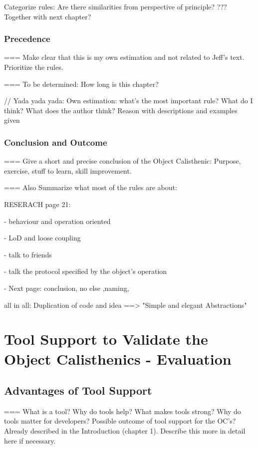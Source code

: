 Categorize rules: Are there similarities from perspective of principle? ??? Together with next chapter?

\subsection{Precedence}
=== Make clear that this is my own estimation and not related to Jeff's text. Prioritize the rules. 

=== To be determined: How long is this chapter?

\begin{itshape}
// Yada yada yada: 
Own estimation: what's the most important rule? 
What do I think?
What does the author think? 
Reason with descriptions and examples given
\end{itshape}

\subsection{Conclusion and Outcome}
=== Give a short and precise conclusion of the Object Calisthenic: Purpose, exercise, stuff to learn, skill improvement. 

=== Also Summarize what most of the rules are about: 

RESERACH page 21: 

- behaviour and operation oriented

- LoD and loose coupling

- talk to friends

- talk the protocol specified by the object's operation

- Next page: conclusion, no else ,naming, 

all in all: Duplication of code and idea
==> "Simple and elegant Abstractions"


\chapter{Tool Support to Validate the Object Calisthenics - Evaluation}
\label{Evaluation}
\section{Advantages of Tool Support}
\label{e:advantages}
=== What is a tool? Why do tools help? What makes tools strong? Why do tools matter for developers?
Possible outcome of tool support for the OC's? Already described in the Introduction (chapter 1). Describe this more in detail here if necessary. 
